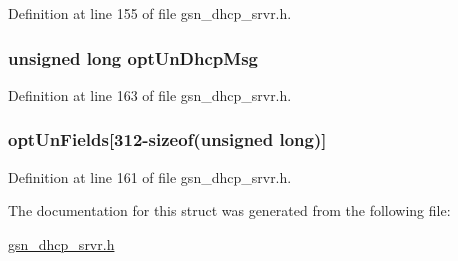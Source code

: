 Definition at line 155 of file gsn\_\-dhcp\_\-srvr.h.

\hypertarget{a00046_a05cd9a158761d6a0f39b0368c71123da}{
\subsubsection[{optUnDhcpMsg}]{\setlength{\rightskip}{0pt plus 5cm}unsigned long {\bf optUnDhcpMsg}}}
\label{a00046_a05cd9a158761d6a0f39b0368c71123da}


Definition at line 163 of file gsn\_\-dhcp\_\-srvr.h.

\hypertarget{a00046_a84256f38f4097ee6713ebf0937ebee9e}{
\subsubsection[{optUnFields}]{ {\bf optUnFields}\mbox{[}312-\/sizeof(unsigned long)\mbox{]}}}
\label{a00046_a84256f38f4097ee6713ebf0937ebee9e}


Definition at line 161 of file gsn\_\-dhcp\_\-srvr.h.



The documentation for this struct was generated from the following file:\begin{DoxyCompactItemize}
\item 
\hyperlink{a00482}{gsn\_\-dhcp\_\-srvr.h}\end{DoxyCompactItemize}
